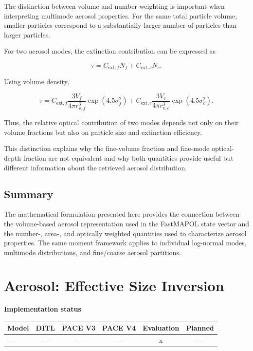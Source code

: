 \documentclass[
  11pt,
  letterpaper,
]{scrreprt}
\begin{document}
The distinction between volume and number weighting is important when
interpreting multimode aerosol properties. For the same total particle
volume, smaller particles correspond to a substantially larger number of
particles than larger particles.

For two aerosol modes, the extinction contribution can be expressed as

\[
\tau
=
C_{\mathrm{ext},f}N_f
+
C_{\mathrm{ext},c}N_c.
\]

Using volume density,

\[
\tau
=
C_{\mathrm{ext},f}
\frac{3V_f}{4\pi r_{v,f}^3}
\exp(4.5\sigma_f^2)
+
C_{\mathrm{ext},c}
\frac{3V_c}{4\pi r_{v,c}^3}
\exp(4.5\sigma_c^2).
\]

Thus, the relative optical contribution of two modes depends not only on
their volume fractions but also on particle size and extinction
efficiency.

This distinction explains why the fine-volume fraction and fine-mode
optical-depth fraction are not equivalent and why both quantities
provide useful but different information about the retrieved aerosol
distribution.

\section{Summary}\label{summary-2}

The mathematical formulation presented here provides the connection
between the volume-based aerosol representation used in the FastMAPOL
state vector and the number-, area-, and optically weighted quantities
used to characterize aerosol properties. The same moment framework
applies to individual log-normal modes, multimode distributions, and
fine/coarse aerosol partitions.

\chapter{Aerosol: Effective Size
Inversion}\label{sec-aerosol-model-inversion}

\textbf{Implementation status}

\begin{longtable}[]{@{}lccccc@{}}
\toprule\noalign{}
Model & DITL & PACE V3 & PACE V4 & Evaluation & Planned \\
\midrule\noalign{}
\endhead
\bottomrule\noalign{}
\endlastfoot
--- & --- & --- & --- & x & --- \\
\end{longtable}
\end{document}
